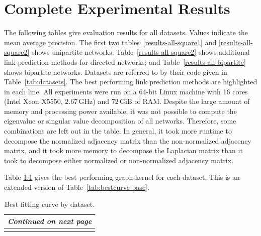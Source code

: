 \documentclass[11pt,a4paper]{book}
\newcommand{\unit}[1]{\ensuremath{\, \mathrm{#1}}}
\begin{document}
{
  \fontsize{7.0}{7.0}\selectfont
  \setlength{\tabcolsep}{1pt}
  
}

\chapter{Complete Experimental Results}
\label{chap:full-results}
The following tables give evaluation results for all datasets.  Values
indicate the mean average precision.  The first two
tables~\ref{results-all-square1} and \ref{results-all-square2} shows
unipartite networks; Table~\ref{results-all-square2} shows additional
link prediction methods for directed networks; and
Table~\ref{results-all-bipartite} shows bipartite networks.  Datasets
are referred to by their code given in Table~\ref{tab:datasets}.  The
best performing link prediction methods are highlighted in each line.
All experiments were run on a 64-bit Linux machine with 16 cores (Intel
Xeon X5550, $2.67 \unit{GHz}$) and $72 \unit{GiB}$ of RAM.  Despite the
large amount of memory and processing power available, it was not
possible to compute the eigenvalue or singular value decomposition of
all networks.  Therefore, some combinations are left out in the table.
In general, it took more runtime to decompose the normalized adjacency
matrix than the non-normalized adjacency matrix, and it took more memory
to decompose the Laplacian matrix than it took to decompose either
normalized or non-normalized adjacency matrix.

{
  \fontsize{8.0}{8.0}\selectfont
  \setlength{\tabcolsep}{2pt}
  
}

{
  \fontsize{7.0}{7.0}\selectfont
  \setlength{\tabcolsep}{2pt}
  
}

\clearpage

{
  \fontsize{8.0}{8.0}\selectfont
  \setlength{\tabcolsep}{2pt}
  
}

Table \ref{tab:bestcurve} gives the best performing graph kernel for each dataset.
This is an extended version of Table~\ref{tab:bestcurve-base}. 

{
  \fontsize{10.0}{10.0}\selectfont

  \begin{longtable}{ llll }

    \caption{Best fitting curve by dataset.} 
    \label{tab:bestcurve}
    \\
    

    \toprule 
    

    \endfirsthead

    \toprule
    
    \midrule

    \endhead

    \midrule
    \multicolumn{4}{c}{\textit{Continued on next page}} \\* 
    \bottomrule

    \endfoot

    \bottomrule
    \endlastfoot

    \midrule

    

  \end{longtable}			
}
\end{document}
